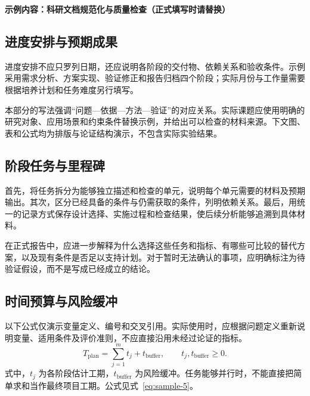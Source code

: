 \noindent\textbf{示例内容：科研文档规范化与质量检查（正式填写时请替换）}\par

\subsection{进度安排与预期成果}
进度安排不应只罗列日期，还应说明各阶段的交付物、依赖关系和验收条件。示例采用需求分析、方案实现、验证修正和报告归档四个阶段；实际月份与工作量需要根据培养计划和任务难度另行填写。

本部分的写法强调“问题—依据—方法—验证”的对应关系。实际课题应使用明确的研究对象、应用场景和约束条件替换示例，并给出可以检查的材料来源。下文图、表和公式均为排版与论证结构演示，不包含实际实验结果。

\subsection{阶段任务与里程碑}
首先，将任务拆分为能够独立描述和检查的单元，说明每个单元需要的材料及预期输出。其次，区分已经具备的条件与仍需获取的条件，列明依赖关系。最后，用统一的记录方式保存设计选择、实施过程和检查结果，使后续分析能够追溯到具体材料。

在正式报告中，应进一步解释为什么选择这些任务和指标、有哪些可比较的替代方案，以及现有条件是否足以支持计划。对于暂时无法确认的事项，应明确标注为待验证假设，而不是写成已经成立的结论。

\subsection{时间预算与风险缓冲}
以下公式仅演示变量定义、编号和交叉引用。实际使用时，应根据问题定义重新说明变量、适用条件及评价准则，不应直接沿用未经过论证的指标。
\begin{equation}\label{eq:sample-5}
T_{\mathrm{plan}}=\sum_{j=1}^{m}t_j+t_{\mathrm{buffer}},\qquad t_j,t_{\mathrm{buffer}}\geq0.
\end{equation}
式中，$t_j$ 为各阶段估计工期，$t_{\mathrm{buffer}}$ 为风险缓冲。任务能够并行时，不能直接把简单求和当作最终项目工期。公式见式~\eqref{eq:sample-5}。

